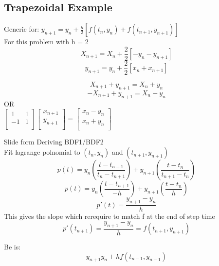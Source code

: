 \documentclass[12pt]{article}
\begin{document}
	\subsection*{Trapezoidal Example}
	Generic for: $y_{n+1} = y_n + \frac{h}{2}[f(t_n,y_n) + f(t_{n+1}, y_{n+1})]$\\
	For this problem with h = 2\\
	$$X_{n+1} = X_n + \frac{2}{2}[-y_n - y_{n+1}]$$
	$$y_{n+1} = y_n + \frac{2}{2}[x_n + x_{n+1}]$$
	
	$$X_{n+1} + y_{n+1} = X_n + y_n$$
	$$-X_{n+1} + y_{n+1} = X_n + y_n$$
	OR\\
	$
	\begin{bmatrix}
	1 & 1 \\
	-1 & 1 \\
	\end{bmatrix}
	\begin{bmatrix}
	x_{n+1} \\
	y_{n+1} \\
	\end{bmatrix}
	=
	\begin{bmatrix}
	x_n - y_n \\
	x_n + y_n \\
	\end{bmatrix}
	$
	
	Slide form Deriving BDF1/BDF2\\
	
	Fit lagrange polnomial to $(t_n, y_n)$ and $(t_{n+1}, y_{n+1})$\\
	$$p(t) = y_n(\frac{t - t_{n+1}}{t_n - t_{n+1}}) + y_{n+1}(\frac{t-t_n}{t_{n+1}-t_n})$$
	$$p(t) = y_n(\frac{t-t_{n+1}}{-h}) + y_{n+1}(\frac{t-t_n}{h})$$
	$$p'(t) = \frac{y_{n+1} - y_n}{h}$$
	This gives the slope which rerequire to match f at the end of step time\\
	$$p'(t_{n+1}) = \frac{y_{n+1}-y_n}{h} = f(t_{n+1}, y_{n+1})$$
	
	Be is:\\
	$$y_{n+1} y_n + hf(t_{n-1}, y_{n-1})$$
	
	
	
\end{document}

